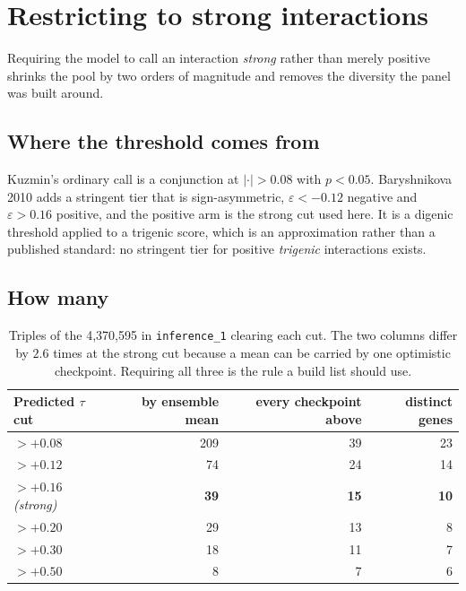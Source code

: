 
\section{Restricting to strong interactions}\label{sec:strong}

Requiring the model to call an interaction \emph{strong} rather than merely
positive shrinks the pool by two orders of magnitude and removes the diversity
the panel was built around.

\subsection{Where the threshold comes from}

Kuzmin's ordinary call is a conjunction at $|{\cdot}| > 0.08$ with $p < 0.05$.
Baryshnikova 2010 adds a stringent tier that is sign-asymmetric,
$\varepsilon < -0.12$ negative and $\varepsilon > 0.16$ positive, and the
positive arm is the strong cut used here. It is a digenic threshold applied to a
trigenic score, which is an approximation rather than a published standard: no
stringent tier for positive \emph{trigenic} interactions exists.

\subsection{How many}

\begin{table}[H]
\centering
\begin{tabular}{lrrr}
\toprule
Predicted $\tau$ cut & by ensemble mean & every checkpoint above & distinct genes \\
\midrule
$> +0.08$ & 209 & 39 & 23 \\
$> +0.12$ & 74  & 24 & 14 \\
$> +0.16$ \emph{(strong)} & \textbf{39} & \textbf{15} & \textbf{10} \\
$> +0.20$ & 29  & 13 & 8 \\
$> +0.30$ & 18  & 11 & 7 \\
$> +0.50$ & 8   & 7  & 6 \\
\bottomrule
\end{tabular}
\caption{Triples of the 4{,}370{,}595 in \texttt{inference\_1} clearing each cut.
The two columns differ by $2.6$ times at the strong cut because a mean can be
carried by one optimistic checkpoint. Requiring all three is the rule a build
list should use.}
\end{table}

